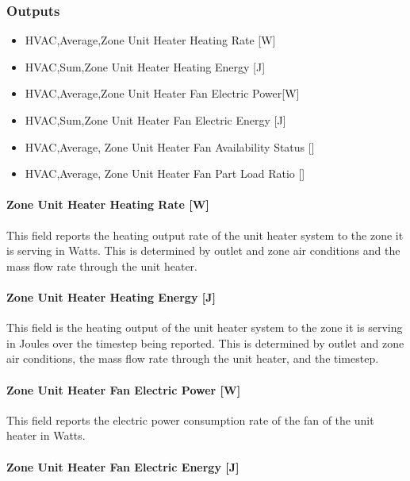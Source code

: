 \subsubsection{Outputs}\label{outputs-3-025}

\begin{itemize}
\item
  HVAC,Average,Zone Unit Heater Heating Rate {[}W{]}
\item
  HVAC,Sum,Zone Unit Heater Heating Energy {[}J{]}
\item
  HVAC,Average,Zone Unit Heater Fan Electric Power{[}W{]}
\item
  HVAC,Sum,Zone Unit Heater Fan Electric Energy {[}J{]}
\item
  HVAC,Average, Zone Unit Heater Fan Availability Status {[]}
\item
  HVAC,Average, Zone Unit Heater Fan Part Load Ratio {[]}
\end{itemize}

\paragraph{Zone Unit Heater Heating Rate {[}W{]}}\label{zone-unit-heater-heating-rate-w}

This field reports the heating output rate of the unit heater system to the zone it is serving in Watts. This is determined by outlet and zone air conditions and the mass flow rate through the unit heater.

\paragraph{Zone Unit Heater Heating Energy {[}J{]}}\label{zone-unit-heater-heating-energy-j}

This field is the heating output of the unit heater system to the zone it is serving in Joules over the timestep being reported. This is determined by outlet and zone air conditions, the mass flow rate through the unit heater, and the timestep.

\paragraph{Zone Unit Heater Fan Electric Power {[}W{]}}\label{zone-unit-heater-fan-electric-power-w}

This field reports the electric power consumption rate of the fan of the unit heater in Watts.

\paragraph{Zone Unit Heater Fan Electric Energy {[}J{]}}\label{zone-unit-heater-fan-electric-energy-j}

